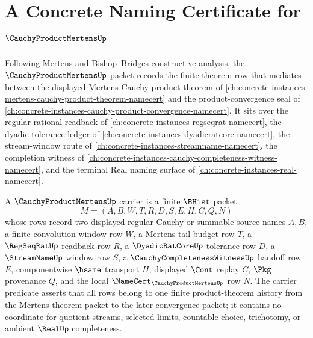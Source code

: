 \chapter{A Concrete Naming Certificate for $\CauchyProductMertensUp$}
\label{ch:concrete-instances-cauchy-product-mertens-namecert}

Following Mertens and Bishop--Bridges constructive analysis, the $\CauchyProductMertensUp$ packet records the finite theorem row that mediates between the displayed Mertens Cauchy product theorem of \autoref{ch:concrete-instances-mertens-cauchy-product-theorem-namecert} and the product-convergence seal of \autoref{ch:concrete-instances-cauchy-product-convergence-namecert}. It sits over the regular rational readback of \autoref{ch:concrete-instances-regseqrat-namecert}, the dyadic tolerance ledger of \autoref{ch:concrete-instances-dyadicratcore-namecert}, the stream-window route of \autoref{ch:concrete-instances-streamname-namecert}, the completion witness of \autoref{ch:concrete-instances-cauchy-completeness-witness-namecert}, and the terminal Real naming surface of \autoref{ch:concrete-instances-real-namecert}.

\begin{definition}
\label{def:cauchy-product-mertens-carrier}
A $\CauchyProductMertensUp$ carrier is a finite $\BHist$ packet
$$
M=(A,B,W,T,R,D,S,E,H,C,Q,N)
$$
whose rows record two displayed regular Cauchy or summable source names $A,B$, a finite convolution-window row $W$, a Mertens tail-budget row $T$, a $\RegSeqRatUp$ readback row $R$, a $\DyadicRatCoreUp$ tolerance row $D$, a $\StreamNameUp$ window row $S$, a $\CauchyCompletenessWitnessUp$ handoff row $E$, componentwise $\hsame$ transport $H$, displayed $\Cont$ replay $C$, $\Pkg$ provenance $Q$, and the local $\NameCert_{\CauchyProductMertensUp}$ row $N$. The carrier predicate asserts that all rows belong to one finite product-theorem history from the Mertens theorem packet to the later convergence packet; it contains no coordinate for quotient streams, selected limits, countable choice, trichotomy, or ambient $\RealUp$ completeness.
\end{definition}

